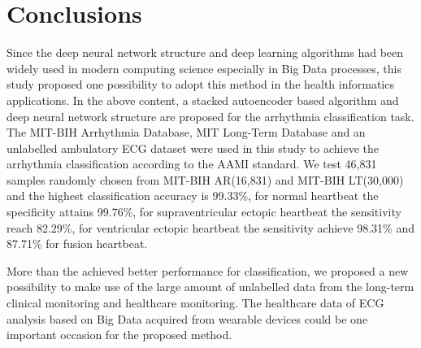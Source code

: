 \documentclass[journal]{IEEEtran}
\begin{document}
\section{Conclusions}
Since the deep neural network structure and deep learning algorithms had been widely used in modern computing science especially in Big Data processes, this study proposed one possibility to adopt this method in the health informatics applications. 
In the above content, a stacked autoencoder based algorithm and deep neural network structure are proposed for the arrhythmia classification task.  
The MIT-BIH Arrhythmia Database, MIT Long-Term Database and an unlabelled ambulatory ECG dataset were used in this study to achieve the arrhythmia classification according to the AAMI standard.
We test 46,831 samples randomly chosen from MIT-BIH AR(16,831) and MIT-BIH LT(30,000) and the highest classification accuracy is 99.33\%, for normal heartbeat the specificity attains 99.76\%, for supraventricular ectopic heartbeat the sensitivity reach  82.29\%, for ventricular ectopic heartbeat the sensitivity achieve 98.31\% and 87.71\% for fusion heartbeat.

More than the achieved better performance for classification, we proposed a new possibility to make use of the large amount of unlabelled data from the long-term clinical monitoring and healthcare monitoring. The healthcare data of ECG analysis based on Big Data acquired from wearable devices could be one important occasion for the proposed method.










%
%
\end{document}
